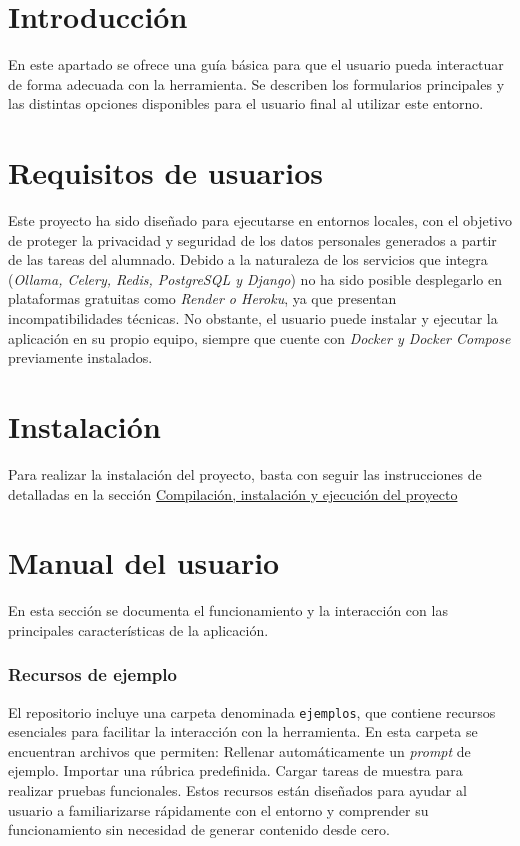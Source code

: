 
\section{Introducción}

En este apartado se ofrece una guía básica para que el usuario pueda interactuar de forma adecuada con la herramienta. Se describen los formularios principales y las distintas opciones disponibles para el usuario final al utilizar este entorno.

\section{Requisitos de usuarios}

Este proyecto ha sido diseñado para ejecutarse en entornos locales, con el objetivo de proteger la privacidad y seguridad de los datos personales generados a partir de las tareas del alumnado. Debido a la naturaleza de los servicios que integra (\textit{Ollama, Celery, Redis, PostgreSQL y Django}) no ha sido posible desplegarlo en plataformas gratuitas como \textit{Render o Heroku}, ya que presentan incompatibilidades técnicas. No obstante, el usuario puede instalar y ejecutar la aplicación en su propio equipo, siempre que cuente con \textit{Docker y Docker Compose} previamente instalados.

\section{Instalación}

Para realizar la instalación del proyecto, basta con seguir las instrucciones de detalladas en la 
sección \hyperref[sec:instalacion]{Compilación, instalación y ejecución del proyecto}


\section{Manual del usuario}

En esta sección se documenta el funcionamiento y la interacción con las principales características de la aplicación.

\subsubsection{Recursos de ejemplo}
El repositorio incluye una carpeta denominada \texttt{ejemplos}, que contiene recursos esenciales para facilitar la interacción con la herramienta. En esta carpeta se encuentran archivos que permiten:
Rellenar automáticamente un \textit{prompt} de ejemplo.
Importar una rúbrica predefinida.
Cargar tareas de muestra para realizar pruebas funcionales.
Estos recursos están diseñados para ayudar al usuario a familiarizarse rápidamente con el entorno y comprender su funcionamiento sin necesidad de generar contenido desde cero.

